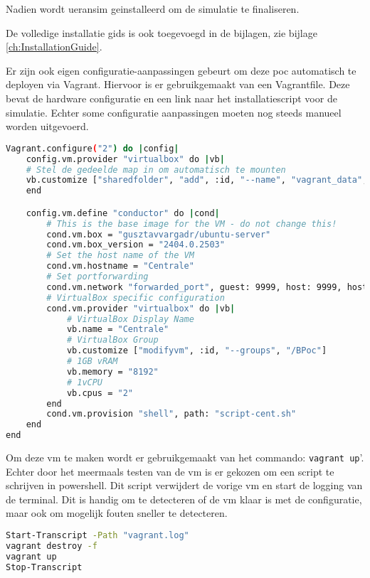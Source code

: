 Nadien wordt \gls{ueransim} geinstalleerd om de simulatie te finaliseren. 

De volledige installatie gids is ook toegevoegd in de bijlagen, zie bijlage \ref{ch:InstallationGuide}.

Er zijn ook eigen configuratie-aanpassingen gebeurt om deze \gls{poc} automatisch te deployen via Vagrant. Hiervoor is er gebruikgemaakt van een Vagrantfile. Deze bevat de hardware configuratie en een link naar het installatiescript voor de simulatie. Echter some configuratie aanpassingen moeten nog steeds manueel worden uitgevoerd.

\begin{lstlisting}[language=sh, caption=Vagrantfile]
Vagrant.configure("2") do |config|
    config.vm.provider "virtualbox" do |vb|
    # Stel de gedeelde map in om automatisch te mounten
    vb.customize ["sharedfolder", "add", :id, "--name", "vagrant_data", "--hostpath", ".", "--automount"]
    end

    config.vm.define "conductor" do |cond|
        # This is the base image for the VM - do not change this!
        cond.vm.box = "gusztavvargadr/ubuntu-server"
        cond.vm.box_version = "2404.0.2503"
        # Set the host name of the VM
        cond.vm.hostname = "Centrale"
        # Set portforwarding
        cond.vm.network "forwarded_port", guest: 9999, host: 9999, host_ip: "127.0.0.1", id: "open5gs"
        # VirtualBox specific configuration
        cond.vm.provider "virtualbox" do |vb|
            # VirtualBox Display Name
            vb.name = "Centrale"
            # VirtualBox Group
            vb.customize ["modifyvm", :id, "--groups", "/BPoc"]
            # 1GB vRAM
            vb.memory = "8192"
            # 1vCPU
            vb.cpus = "2"
        end
        cond.vm.provision "shell", path: "script-cent.sh"
    end
end
\end{lstlisting}

Om deze \gls{vm} te maken wordt er gebruikgemaakt van het commando: \verb|vagrant up|'. Echter door het meermaals testen van de \gls{vm} is er gekozen om een script te schrijven in powershell. Dit script verwijdert de vorige \gls{vm} en start de logging van de terminal. Dit is handig om te detecteren of de \gls{vm} klaar is met de configuratie, maar ook om mogelijk fouten sneller te detecteren.

\begin{lstlisting}[language=sh, caption=Build Script]
Start-Transcript -Path "vagrant.log"
vagrant destroy -f
vagrant up
Stop-Transcript
\end{lstlisting}



